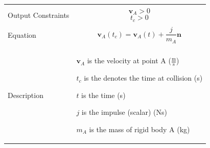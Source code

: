 \documentclass[12pt]{article}
\begin{document}
\begin{minipage}{\textwidth}
\begin{tabular}{p{} p{}}
                                             \\ \midrule \\
                                             Output Constraints & \begin{displaymath}
                                                                  {\mathbf{v}_{A}}>0
                                                                  \end{displaymath}
                                                                  \begin{displaymath}
                                                                  {t_{c}}>0
                                                                  \end{displaymath}
                                                                  \\ \midrule \\
                                                                  Equation & \begin{displaymath}
                                                                             {\mathbf{v}_{A}}\left({t_{c}}\right)={\mathbf{v}_{A}}\left(t\right)+\frac{j}{{m_{A}}} \mathbf{n}
                                                                             \end{displaymath}
                                                                             \\ \midrule \\
                                                                             Description & \begin{symbDescription}
                                                                                           \item{${\mathbf{v}_{A}}$ is the velocity at point A ($\frac{\text{m}}{\text{s}}$)}
                                                                                           \item{${t_{c}}$ is the denotes the time at collision (s)}
                                                                                           \item{$t$ is the time (s)}
                                                                                           \item{$j$ is the impulse (scalar) (Ns)}
                                                                                           \item{${m_{A}}$ is the mass of rigid body A (kg)}

\end{symbDescription}
\end{tabular}
\end{minipage}
\end{document}
